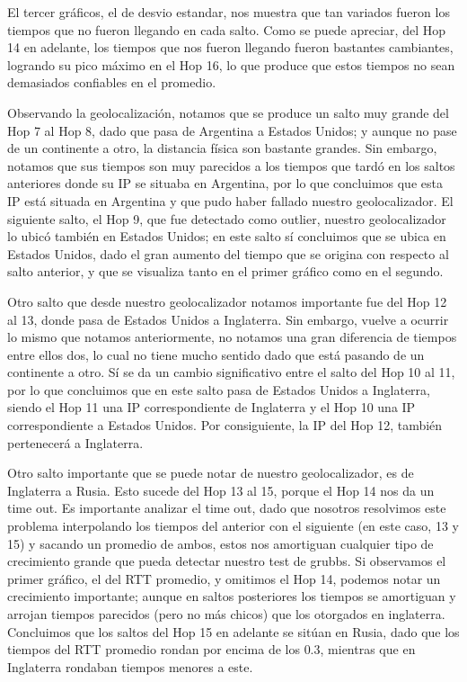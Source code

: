 El tercer gráficos, el de desvio estandar, nos muestra que tan variados fueron los tiempos que no fueron llegando en cada salto. Como se puede apreciar, del Hop 14 en adelante, los tiempos que nos fueron llegando fueron bastantes cambiantes, logrando su pico máximo en el Hop 16, lo que produce que estos tiempos no sean demasiados confiables en el promedio.\newline

Observando la geolocalización, notamos que se produce un salto muy grande del Hop 7 al Hop 8, dado que pasa de Argentina a Estados Unidos; y aunque no pase de un continente a otro, la distancia física son bastante grandes. Sin embargo, notamos que sus tiempos son muy parecidos a los tiempos que tardó en los saltos anteriores donde su IP se situaba en Argentina, por lo que concluimos que esta IP está situada en Argentina y que pudo haber fallado nuestro geolocalizador. El siguiente salto, el Hop 9, que fue detectado como outlier, nuestro geolocalizador lo ubicó también en Estados Unidos; en este salto sí concluimos que se ubica en Estados Unidos, dado el gran aumento del tiempo que se origina con respecto al salto anterior, y que se visualiza tanto en el primer gráfico como en el segundo.\newline

Otro salto que desde nuestro geolocalizador notamos importante fue del Hop 12 al 13, donde pasa de Estados Unidos a Inglaterra. Sin embargo, vuelve a ocurrir lo mismo que notamos anteriormente, no notamos una gran diferencia de tiempos entre ellos dos, lo cual no tiene mucho sentido dado que está pasando de un continente a otro. Sí se da un cambio significativo entre el salto del Hop 10 al 11, por lo que concluimos que en este salto pasa de Estados Unidos a Inglaterra, siendo el Hop 11 una IP correspondiente de Inglaterra y el Hop 10 una IP correspondiente a Estados Unidos. Por consiguiente, la IP del Hop 12, también pertenecerá a Inglaterra.\newline

Otro salto importante que se puede notar de nuestro geolocalizador, es de Inglaterra a Rusia. Esto sucede del Hop 13 al 15, porque el Hop 14 nos da un time out. Es importante analizar el time out, dado que nosotros resolvimos este problema interpolando los tiempos del anterior con el siguiente (en este caso, 13 y 15) y sacando un promedio de ambos, estos nos amortiguan cualquier tipo de crecimiento grande que pueda detectar nuestro test de grubbs. Si observamos el primer gráfico, el del RTT promedio, y omitimos el Hop 14, podemos notar un crecimiento importante; aunque en saltos posteriores los tiempos se amortiguan y arrojan tiempos parecidos (pero no más chicos) que los otorgados en inglaterra. Concluimos que los saltos del Hop 15 en adelante se sitúan en Rusia, dado que los tiempos del RTT promedio rondan por encima de los $0.3$, mientras que en Inglaterra rondaban tiempos menores a este.\newline

